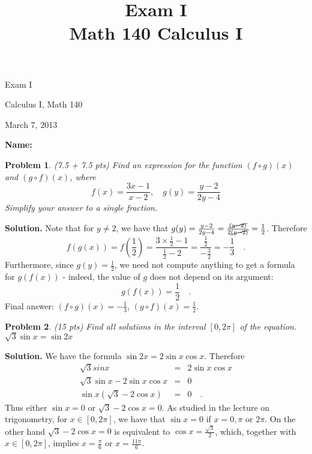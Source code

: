 \documentclass{article}
\date{}
\title{Exam I\\ Math 140 Calculus I }
\newtheorem{problem}{Problem}
\begin{document}
\begin{center}
\LARGE
Exam I

Calculus I, Math 140

March 7, 2013
\end{center}

\noindent \textbf{Name:}
\medskip

\begin{problem}
(7.5 + 7.5 pts) Find an expression for the function $(f\circ g)(x)$ and $(g\circ f)(x)$, where
\[
f(x)= \frac{3x-1}{x-2},\quad  g(y)=\frac{y-2 }{2y-4}
\] Simplify your answer to a single fraction.
\end{problem}
\textbf{Solution. }
Note that for $y\neq 2$, we have that $g(y)= \frac{y-2}{2y-4}= \frac{\cancel{(y-2)}}{2\cancel{(y-2)}}= \frac{1}{2}$. Therefore
\[
f(g(x))=f(\frac{1}{2})= \frac{3\times\frac{1}{2}-1}{\frac{1}{2}-2}= \frac{\frac{1}2}{-\frac{3}2}= -\frac{1}3\quad .
\]
Furthermore, since $g(y)=\frac{1}{2}$, we need not compute anything to get a formula for $g(f(x))$ - indeed, the value of $g$ does not depend on its argument:
\[
g(f(x))=\frac{1}{2}\quad .
\]
Final answer: $(f\circ g) (x)=-\frac{1}{3}$, $(g\circ f)(x)=\frac{1}2$.
\begin{problem} (15 pts)
Find all solutions in the interval $[0,2\pi]$ of the equation.
$\sqrt{ 3}\sin x=  \sin 2x$
\end{problem}
\textbf{Solution. }
We have the formula $\sin 2x=2\sin x \cos x $. Therefore
\[\begin{array}{rcl}
\sqrt{3} sin x&=& 2\sin x \cos x\\
\sqrt{3}\sin x - 2\sin x \cos x &=& 0\\
\sin x (\sqrt{3}- 2\cos x)&=&0\quad .
\end{array}
\]
Thus either $\sin x =0$ or $\sqrt{3}- 2\cos x=0$. As studied in the lecture on trigonometry, for $x\in [0,2\pi]$, we have that $\sin x=0$
if $x=0,\pi$ or $2\pi$. On the other hand $\sqrt 3-2\cos x=0$ is equivalent to $\cos x=\frac{\sqrt{3}}{2}$, which, together with $x\in [0,2\pi]$, implies $x=\frac{\pi}{6} $ or $x=\frac{11\pi}{6}$.
\end{document}
